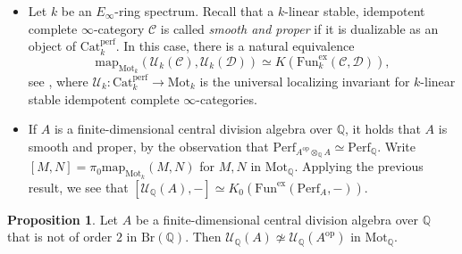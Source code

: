 \documentclass[10pt]{amsart}
\theoremstyle{definition}
\newtheorem{proposition}[theorem]{Proposition}
\newcommand{\Fun}{\text{Fun}}
\newcommand{\Cat}{\mathrm{Cat}}
\newcommand{\perf}{\mathrm{perf}}
\newcommand{\op}{\mathrm{op}}
\begin{document}
\begin{itemize}
\item Let $k$ be an $E_\infty$-ring spectrum. Recall that a $k$-linear stable, idempotent complete $\infty$-category $\mathcal{C}$ is called \emph{smooth and proper} if it is dualizable as an object of $\Cat^\perf_{k}$. In this case, there is a natural equivalence
\[ \mathrm{map}_{\mathrm{Mot}_k}( \mathcal{U}_k( \mathcal{C}), \mathcal{U}_k( \mathcal{D}) ) \simeq K( \Fun^{\mathrm{ex}}_k( \mathcal{C}, \mathcal{D})),\]
see \cite[Theorem 5.25]{HoyoisScherotzkeSibilla2017HigherTraces}, where $\mathcal{U}_k : \Cat^\perf_{k} \rightarrow \mathrm{Mot}_k$ is the universal localizing invariant for $k$-linear stable idempotent complete $\infty$-categories.
\item If $A$ is a finite-dimensional central division algebra over $\mathbb{Q}$, it holds that $A$ is smooth and proper, by the observation that $\mathrm{Perf}_{A^{\op} \otimes_\mathbb{Q} A} \simeq \mathrm{Perf}_\mathbb{Q}$. Write $[M,N] = \pi_0 \mathrm{map}_{\mathrm{Mot}_k}( M, N)$ for $M, N$ in $\mathrm{Mot}_\mathbb{Q}$. Applying the previous result, we see that $ [ \mathcal{U}_\mathbb{Q}(A), - ] \simeq  K_0( \mathrm{Fun}^{\mathrm{ex}}( \mathrm{Perf}_A, - )).$
\end{itemize}

\begin{proposition} \label{notofordertwo}
Let $A$ be a finite-dimensional central division algebra over $\mathbb{Q}$ that is not of order $2$ in $\mathrm{Br}(\mathbb{Q})$. Then $\mathcal{U}_\mathbb{Q}(A) \not\simeq \mathcal{U}_\mathbb{Q}(A^{\op})$ in $\mathrm{Mot}_\mathbb{Q}$.
\end{proposition}
\end{document}
